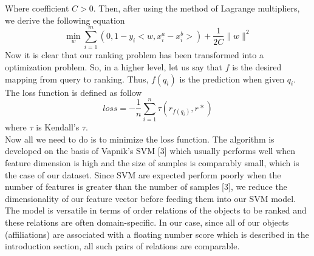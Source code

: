 \documentclass[letterpaper]{article}
\begin{document}
Where coefficient $C>0$. Then, after using the method of Lagrange multipliers, we derive the following equation
\begin{equation}
\min_w \sum_{i=1}^{m}(0,1-y_i<w,x_i^a-x_i^b>)+\frac{1}{2C}\|w\|^2
\end{equation}
Now it is clear that our ranking problem has been transformed into a optimization problem. So, in a higher level, let us say that $f$ is the desired mapping from query to ranking. Thus, $f(q_i)$ is the prediction when given $q_i$. The loss function is defined as follow\\
\begin{equation}
loss = - \frac{1}{n} \sum_{i=1}^n \tau(r_{f(q_i)},r*)
\end{equation}
where $\tau$ is Kendall's $\tau$.\\
Now all we need to do is to minimize the loss function. 
The algorithm is developed on the basis of Vapnik's SVM [3] which usually performs well when feature dimension is high and the size of samples is comparably small, which is the case of our dataset. Since SVM are expected perform poorly when the number of features is greater than the number of samples [3], we reduce the dimensionality of our feature vector before feeding them into our SVM model. The model is versatile in terms of order relations of the objects to be ranked and these relations are often domain-specific. In our case, since all of our objects (affiliations) are associated with a floating number score which is described in the introduction section, all such pairs of relations are comparable. 
\end{document}
